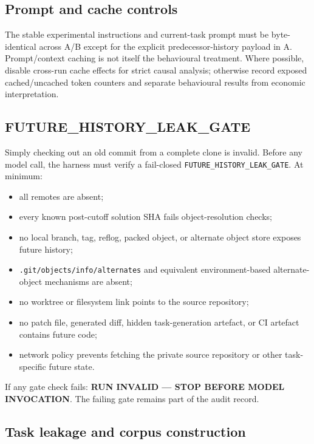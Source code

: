 \subsection{Prompt and cache controls}

The stable experimental instructions and current-task prompt must be byte-identical across A/B except for the explicit predecessor-history payload in A. Prompt/context caching is not itself the behavioural treatment. Where possible, disable cross-run cache effects for strict causal analysis; otherwise record exposed cached/uncached token counters and separate behavioural results from economic interpretation.

\subsection{FUTURE_HISTORY_LEAK_GATE}

Simply checking out an old commit from a complete clone is invalid. Before any model call, the harness must verify a fail-closed \texttt{FUTURE_HISTORY_LEAK_GATE}. At minimum:

\begin{itemize}
    \item all remotes are absent;
    \item every known post-cutoff solution SHA fails object-resolution checks;
    \item no local branch, tag, reflog, packed object, or alternate object store exposes future history;
    \item \texttt{.git/objects/info/alternates} and equivalent environment-based alternate-object mechanisms are absent;
    \item no worktree or filesystem link points to the source repository;
    \item no patch file, generated diff, hidden task-generation artefact, or CI artefact contains future code;
    \item network policy prevents fetching the private source repository or other task-specific future state.
\end{itemize}

If any gate check fails: \textbf{RUN INVALID --- STOP BEFORE MODEL INVOCATION}. The failing gate remains part of the audit record.

\subsection{Task leakage and corpus construction}


